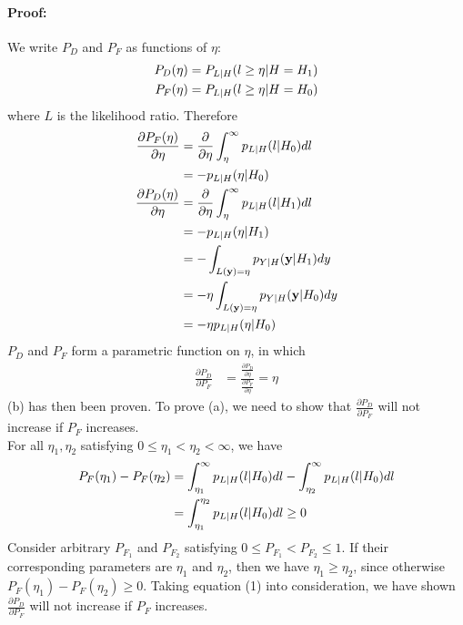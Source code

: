 \documentclass{article}
\begin{document}
\paragraph{Proof:}
We write $P_D$ and $P_F$ as functions of $\eta$:
\begin{align}
	P_D(\eta)&=P_{L|H}(l\ge \eta|H=H_1)\notag\\
	P_F(\eta)&=P_{L|H}(l\ge \eta|H=H_0)\notag
\end{align}
where $L$ is the likelihood ratio. Therefore
\begin{align}
	\frac{\partial P_F(\eta)}{\partial \eta}&=\frac{\partial}{\partial \eta}\int^{\infty}_{\eta}p_{L|H}(l|H_0)dl\notag\\
	&=-p_{L|H}(\eta|H_0)\notag\\
	\frac{\partial P_D(\eta)}{\partial \eta}&=\frac{\partial}{\partial \eta}\int^{\infty}_{\eta}p_{L|H}(l|H_1)dl\notag\\
	&=-p_{L|H}(\eta|H_1)\notag\\
	&=-\int_{L(\mathbf{y})=\eta}p_{Y|H}(\mathbf{y}|H_1)dy\notag\\
	&=-\eta\int_{L(\mathbf{y})=\eta}p_{Y|H}(\mathbf{y}|H_0)dy\notag\\
	&=-\eta p_{L|H}(\eta|H_0)\notag
\end{align}
$P_D$ and $P_F$ form a parametric function on $\eta$, in which
\begin{align}
	\frac{\partial P_D}{\partial P_F}&=\frac{\frac{\partial P_D}{\partial \eta}}{\frac{\partial P_F}{\partial \eta}}=\eta
\end{align}
(b) has then been proven. To prove (a), we need to show that $\frac{\partial P_D}{\partial P_F}$ will not increase if $P_F$ increases.\\
For all $\eta_1, \eta_2$ satisfying $0\le \eta_1< \eta_2< \infty$, we have
\begin{align}
	P_F(\eta_1)-P_F(\eta_2)&=\int^{\infty}_{\eta_1}p_{L|H}(l|H_0)dl-\int^{\infty}_{\eta_2}p_{L|H}(l|H_0)dl\notag\\
	&=\int^{\eta_2}_{\eta_1}p_{L|H}(l|H_0)dl\ge 0\notag
\end{align}
Consider arbitrary $P_{F_1}$ and $P_{F_2}$ satisfying $0\le P_{F_1} < P_{F_2}\le 1$. If their corresponding parameters are $\eta_1$ and $\eta_2$, then we have $\eta_1\ge \eta_2$, since otherwise $P_F(\eta_1)-P_F(\eta_2)\ge 0$. Taking equation (1) into consideration, we have shown $\frac{\partial P_D}{\partial P_F}$ will not increase if $P_F$ increases.
\end{document}
